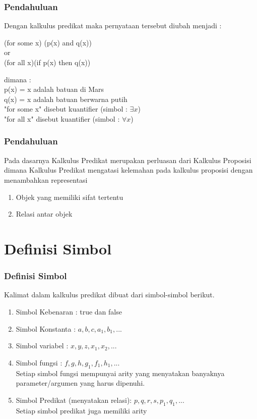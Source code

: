 \documentclass[handout]{beamer}
\theoremstyle{definition}
\theoremstyle{example}
\begin{document}
\begin{frame}
	\frametitle{Pendahuluan}
	Dengan kalkulus predikat maka pernyataan tersebut diubah menjadi :\\
	\begin{center}
		\color{blue}
		(for some x) (p(x) and q(x))\\
		or\\
		(for all x)(if p(x) then q(x))\\
	\end{center}
	dimana :\\
	p(x) = x adalah batuan di Mars \\
	q(x) = x adalah batuan berwarna putih\\
	"for some x" disebut kuantifier (simbol : $\exists x$) \\
	"for all x" disebut kuantifier (simbol : $\forall x$) \\
\end{frame}

\begin{frame}
	\frametitle{Pendahuluan}
	Pada dasarnya Kalkulus Predikat merupakan perluasan	dari Kalkulus Proposisi dimana Kalkulus Predikat mengatasi kelemahan pada kalkulus proposisi dengan menambahkan representasi
	\begin{enumerate}
		\item Objek yang memiliki sifat tertentu
	    \item Relasi antar objek
    \end{enumerate}	    
\end{frame}

\section{Definisi Simbol}
\begin{frame}
	\frametitle{Definisi Simbol}
	Kalimat dalam kalkulus predikat dibuat dari simbol-simbol berikut.\\
	\begin{enumerate}
		\item Simbol Kebenaran : true dan false
	 	\item Simbol Konstanta : $a, b, c, a_1, b_1, ...$
	 	\item Simbol variabel : $x, y, z, x_1, x_2, ...$
	 	\item Simbol fungsi : $f, g, h, g_1, f_1, h_1, ...$ \\
	Setiap simbol fungsi mempunyai arity yang menyatakan banyaknya parameter/argumen yang harus dipenuhi.
	 	\item Simbol Predikat (menyatakan relasi): $p, q, r, s, p_1, q_1,  ...$\\
	Setiap simbol predikat juga memiliki arity
    \end{enumerate}	 
\end{frame}	
\end{document}
